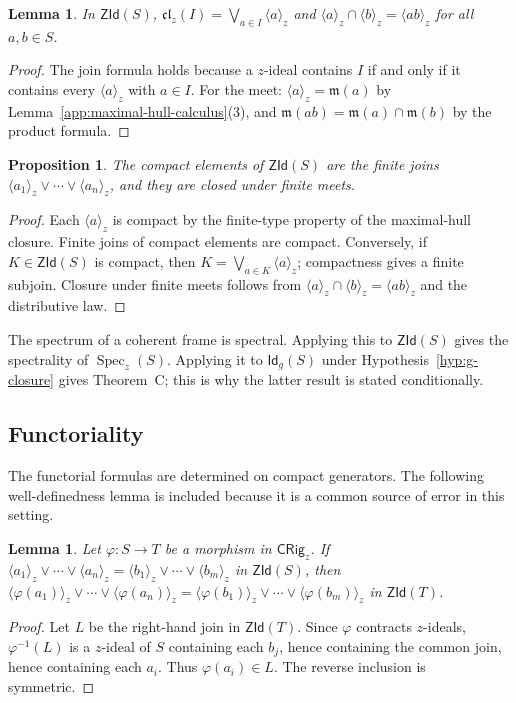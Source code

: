 \documentclass[11pt,leqno]{amsart}
\theoremstyle{plain}
\newtheorem{proposition}[theorem]{Proposition}
\newtheorem{lemma}[theorem]{Lemma}
\theoremstyle{definition}
\theoremstyle{remark}
\numberwithin{equation}{section}
\DeclareMathOperator{\Spec}{Spec}
\newcommand{\ZId}{\mathsf{ZId}}
\newcommand{\GCl}{\mathsf{Id}_{g}}
\newcommand{\mfrak}{\mathfrak m}
\newcommand{\clz}{\mathfrak{cl}_{z}}
\newcommand{\ideal}[1]{\langle #1\rangle}
\begin{document}
\begin{lemma}\label{app:coherent-expanded}
In $\ZId(S)$, $\clz(I)=\bigvee_{a\in I}\ideal{a}_z$ and
$\ideal{a}_z\cap\ideal{b}_z=\ideal{ab}_z$ for all $a,b\in S$.
\end{lemma}
\begin{proof}
The join formula holds because a $z$-ideal contains $I$ if and only
if it contains every $\ideal{a}_z$ with $a\in I$.
For the meet:
$\ideal{a}_z=\mfrak(a)$ by Lemma~\ref{app:maximal-hull-calculus}(3),
and $\mfrak(ab)=\mfrak(a)\cap\mfrak(b)$ by the product formula.
\end{proof}

\begin{proposition}\label{app:compact-expanded}
The compact elements of $\ZId(S)$ are the finite joins
$\ideal{a_1}_z\vee\cdots\vee\ideal{a_n}_z$,
and they are closed under finite meets.
\end{proposition}
\begin{proof}
Each $\ideal{a}_z$ is compact by the finite-type property of the
maximal-hull closure.
Finite joins of compact elements are compact.
Conversely, if $K\in\ZId(S)$ is compact, then
$K=\bigvee_{a\in K}\ideal{a}_z$; compactness gives a finite subjoin.
Closure under finite meets follows from
$\ideal{a}_z\cap\ideal{b}_z=\ideal{ab}_z$ and the distributive law.
\end{proof}

The spectrum of a coherent frame is spectral.
Applying this to $\ZId(S)$ gives the spectrality of $\Spec_z(S)$.
Applying it to $\GCl(S)$ under Hypothesis~\ref{hyp:g-closure} gives
Theorem~C; this is why the latter result is stated conditionally.

\subsection{Functoriality}

The functorial formulas are determined on compact generators.
The following well-definedness lemma is included because
it is a common source of error in this setting.

\begin{lemma}\label{app:functor-expanded}
Let $\varphi:S\to T$ be a morphism in $\mathsf{CRig}_z$.
If $\ideal{a_1}_z\vee\cdots\vee\ideal{a_n}_z
=\ideal{b_1}_z\vee\cdots\vee\ideal{b_m}_z$ in $\ZId(S)$, then
$\ideal{\varphi(a_1)}_z\vee\cdots\vee\ideal{\varphi(a_n)}_z
=\ideal{\varphi(b_1)}_z\vee\cdots\vee\ideal{\varphi(b_m)}_z$
in $\ZId(T)$.
\end{lemma}
\begin{proof}
Let $L$ be the right-hand join in $\ZId(T)$.
Since $\varphi$ contracts $z$-ideals, $\varphi^{-1}(L)$ is a
$z$-ideal of $S$ containing each $b_j$,
hence containing the common join, hence containing each $a_i$.
Thus $\varphi(a_i)\in L$.
The reverse inclusion is symmetric.
\end{proof}
\end{document}
